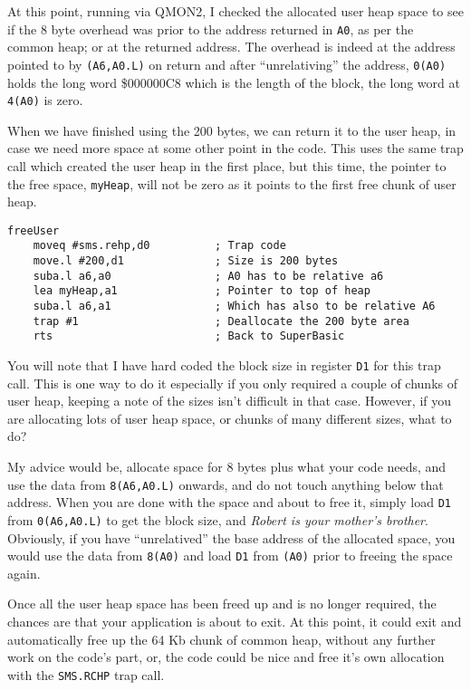 At this point, running via QMON2, I checked the allocated user heap
space to see if the 8 byte overhead was prior to the address returned
in \texttt{A0}, as per the common heap; or at the returned address.
The overhead is indeed at the address pointed to by \texttt{(A6,A0.L)}
on return and after ``unrelativing'' the address, \texttt{0(A0)}
holds the long word \$000000C8 which is the length of the block, the
long word at \texttt{4(A0)} is zero.

When we have finished using the 200 bytes, we can return it to the
user heap, in case we need more space at some other point in the code.
This uses the same trap call which created the user heap in the first
place, but this time, the pointer to the free space, \texttt{myHeap},
will not be zero as it points to the first free chunk of user heap.

\begin{lstlisting}[caption={User Heap Deallocation},label={lis:User-Heap-Deallocation}]
freeUser  
    moveq #sms.rehp,d0          ; Trap code
    move.l #200,d1              ; Size is 200 bytes
    suba.l a6,a0                ; A0 has to be relative a6
    lea myHeap,a1               ; Pointer to top of heap
    suba.l a6,a1                ; Which has also to be relative A6
    trap #1                     ; Deallocate the 200 byte area
    rts                         ; Back to SuperBasic

\end{lstlisting}

You will note that I have hard coded the block size in register \texttt{D1}
for this trap call. This is one way to do it especially if you only
required a couple of chunks of user heap, keeping a note of the sizes
isn't difficult in that case. However, if you are allocating lots
of user heap space, or chunks of many different sizes, what to do?

My advice would be, allocate space for 8 bytes plus what your code
needs, and use the data from \texttt{8(A6,A0.L)} onwards, and do not
touch anything below that address. When you are done with the space
and about to free it, simply load \texttt{D1} from \texttt{0(A6,A0.L)}
to get the block size, and \emph{Robert is your mother's brother}.
Obviously, if you have ``unrelatived'' the base address of the allocated
space, you would use the data from \texttt{8(A0)} and load \texttt{D1}
from \texttt{(A0)} prior to freeing the space again.

Once all the user heap space has been freed up and is no longer required,
the chances are that your application is about to exit. At this point,
it could exit and automatically free up the 64 Kb chunk of common
heap, without any further work on the code's part, or, the code could
be nice and free it's own allocation with the \texttt{SMS.RCHP} trap
call.


